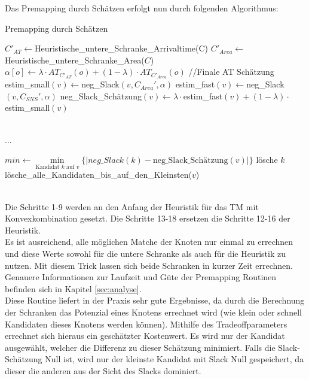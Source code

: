 \documentclass[11pt, a4paper, german]{article}
\begin{document}
Das Premapping durch Schätzen erfolgt nun durch folgenden Algorithmus:\\
\newpage
 
\begin{algorithm}[H]
 \LinesNumbered
 \DontPrintSemicolon
 \caption{Premapping durch Schätzen}
 $C'_{AT} \gets $Heuristische\_untere\_Schranke\_Arrivaltime(C)\;
$C'_{Area} \gets$ Heuristische\_untere\_Schranke\_Area($C$)\; 
{
	$\alpha[o] \gets \lambda \cdot AT_{C'_{AT}}(o) + (1-\lambda)\cdot AT_{C'_{Area}}(o)$ //Finale AT Sch\"atzung \;
}
 {
  estim\_small$(v) \gets $neg\_Slack$(v,C_{Area}',\alpha)$\;
  estim\_fast$(v) \gets $neg\_Slack$(v,C_{SNS}',\alpha)$\;
  neg\_Slack\_Sch\"atzung$(v) \gets \lambda \cdot $estim\_fast$(v) + (1-\lambda)\cdot$estim\_small$(v)$\;
 }
 
\ \\...\\ \;
 
  {
    $min \gets \min\limits_{\text{Kandidat }k\text{ auf }v}\{|neg\_Slack(k)-\text{neg\_Slack\_Sch\"atzung}(v)|\}$\;
    {
      {
	l\"osche $k$\;
      }
    }
    {
      lösche\_alle\_Kandidaten\_bis\_auf\_den\_Kleinsten($v$)\;
      }
   }
\end{algorithm}\ \\
 
Die Schritte 1-9 werden an den Anfang der Heuristik für das TM mit Konvexkombination gesetzt. Die Schritte 13-18 ersetzen die Schritte 12-16 der Heuristik.\\ 
Es ist ausreichend, alle möglichen Matche der Knoten nur einmal zu errechnen und diese Werte sowohl für die untere Schranke als auch für die Heuristik zu nutzen. Mit diesem Trick lassen sich beide Schranken in kurzer Zeit errechnen. Genauere Informationen zur Laufzeit und Güte der Premapping Routinen befinden sich in Kapitel \ref{sec:analyse}.\\
Diese Routine liefert in der Praxis sehr gute Ergebnisse, da durch die Berechnung der Schranken das Potenzial eines Knotens errechnet wird (wie klein oder schnell Kandidaten dieses Knotens werden können). Mithilfe des Tradeoffparameters errechnet sich hieraus ein geschätzter Kostenwert. Es wird nur der Kandidat ausgewählt, welcher die Differenz zu dieser Schätzung minimiert. Falls die Slack-Schätzung Null ist, wird nur der kleinste Kandidat mit Slack Null gespeichert, da dieser die anderen aus der Sicht des Slacks dominiert.
\end{document}
